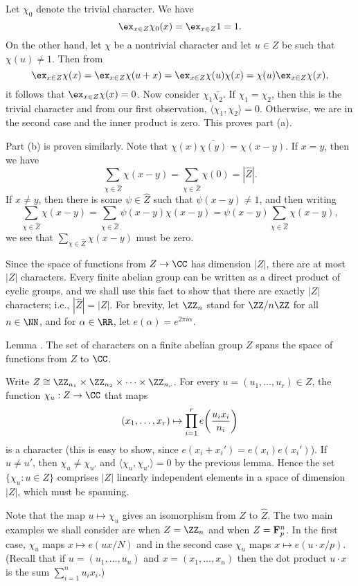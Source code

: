 \proof Let $\chi_0$ denote the trivial character. We have
$$\ex_{x\in Z} \chi_0(x) = \ex_{x\in Z} 1 = 1.$$
On the other hand, let $\chi$ be a nontrivial character and let $u\in Z$ be such that $\chi(u)\ne 1$. Then from
$$\ex_{x\in Z} \chi(x) = \ex_{x\in Z} \chi(u+x) = \ex_{x\in Z}\chi(u)\chi(x) = \chi(u)\ex_{x\in Z}\chi(x),$$
it follows that $\ex_{x\in Z}\chi(x) = 0$. Now consider $\chi_1\bar{\chi_2}$. If $\chi_1 = \chi_2$, then
this is the trivial character and from our first observation, $\langle \chi_1,\chi_2\rangle = 0$. Otherwise,
we are in the second case and the inner product is zero. This proves part (a).

Part (b) is proven similarly. Note that $\chi(x)\bar{\chi(y)} = \chi(x-y)$. If $x=y$, then we have
$$\sum_{\chi\in\hat Z} \chi(x-y) = \sum_{\chi\in\hat Z} \chi(0) = |\hat Z|.$$
If $x\ne y$, then there is some $\psi\in \hat Z$ such that $\psi(x-y)\ne 1$, and then writing
$$\sum_{\chi\in \hat Z} \chi(x-y) = \sum_{\chi\in\hat Z} \psi(x-y)\chi(x-y)
= \psi(x-y)\sum_{\chi\in\hat Z} \chi(x-y),$$
we see that $\sum_{\chi\in\hat Z} \chi(x-y)$ must be zero.\slug

Since the space of functions from $Z\to \CC$ has dimension $|Z|$, there are at most $|Z|$ characters.
Every finite abelian group can be written as a direct product of cyclic groups, and we shall use this fact
to show that there are exactly $|Z|$ characters; i.e., $|\hat Z| = |Z|$. For brevity, let $\ZZ_n$ stand for $\ZZ/n\ZZ$ for all $n\in\NN$,
and for $\alpha\in \RR$, let $e(\alpha) = e^{2\pi i\alpha}$.

\proclaim Lemma \advthm.
The set of characters on a finite abelian group $Z$ spans the space of functions from $Z$ to $\CC$.

\proof Write $Z \cong \ZZ_{n_1} \times \ZZ_{n_2}\times \cdots\times \ZZ_{n_r}$. For every
$u = (u_1,\ldots, u_r)\in Z$, the function $\chi_u : Z\to \CC$ that maps
$$(x_1,\ldots, x_r) \mapsto \prod_{i=1}^r e\biggl( {u_ix_i\over n_i}\biggr)$$
is a character (this is easy to show, since $e(x_i + x_i') = e(x_i)e(x_i')$). If $u\ne u'$,
then $\chi_u\ne\chi_{u'}$ and $\langle \chi_u,\chi_{u'}\rangle = 0$ by the previous lemma. Hence
the set $\{\chi_u : u\in Z\}$ comprises $|Z|$ linearly independent elements in a space of dimension $|Z|$,
which must be spanning.\slug

Note that the map $u\mapsto \chi_u$ gives an isomorphism from $Z$ to $\hat Z$.
The two main examples we shall consider are when $Z = \ZZ_n$ and when $Z = {\bf F}_p^n$. In the first
case, $\chi_u$ maps $x\mapsto e(ux/N)$ and in the second case $\chi_u$ maps $x\mapsto e(u\cdot x/p)$.
(Recall that if $u = (u_1,\ldots, u_n)$ and $x = (x_1,\ldots, x_n)$ then the dot product $u\cdot x$
is the sum $\sum_{i=1}^n u_ix_i$.)

